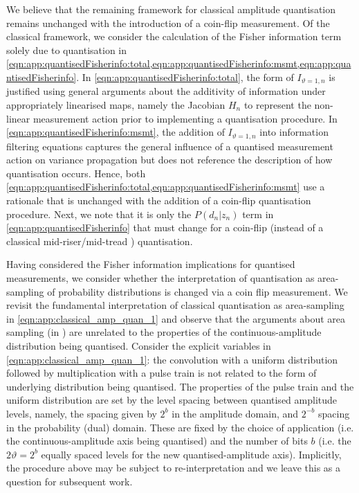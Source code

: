 We believe that the remaining framework for classical amplitude quantisation remains unchanged with the introduction of a coin-flip measurement. Of the classical framework, we consider the calculation of the Fisher information term solely due to quantisation in  \cref{eqn:app:quantisedFisherinfo:total,eqn:app:quantisedFisherinfo:msmt,eqn:app:quantisedFisherinfo}.  In \cref{eqn:app:quantisedFisherinfo:total}, the form of  $I_{\vartheta=1, n}$ is justified using general arguments about the additivity of information under appropriately linearised maps, namely the Jacobian $H_n$ to represent the non-linear measurement action prior to implementing a quantisation procedure. In \cref{eqn:app:quantisedFisherinfo:msmt}, the addition of $I_{\vartheta=1, n}$ into information filtering equations captures the general influence of a quantised measurement action on variance propagation but does not reference the description of how quantisation occurs. Hence, both \cref{eqn:app:quantisedFisherinfo:total,eqn:app:quantisedFisherinfo:msmt} use a rationale that is  unchanged with the addition of a coin-flip quantisation procedure. Next, we note that it is only the $P(d_n|z_n)$ term in \cref{eqn:app:quantisedFisherinfo} that must change for a coin-flip (instead of a classical mid-riser/mid-tread ) quantisation.

Having considered the Fisher information implications for quantised measurements, we consider whether the interpretation of quantisation as area-sampling of probability distributions is changed via a coin flip measurement. We revisit the fundamental interpretation of classical quantisation as area-sampling in \cref{eqn:app:classical_amp_quan_1} and observe that the arguments about area sampling (in \cite{widrow1996,karlsson2005}) are unrelated to the properties of the continuous-amplitude distribution being quantised. Consider the explicit variables in \cref{eqn:app:classical_amp_quan_1}: the convolution with a uniform distribution followed by multiplication with a pulse train is not related to the form of underlying distribution being quantised. The properties of the pulse train and the uniform distribution are set by the level spacing between quantised amplitude levels, namely, the spacing given by $2^b$ in the amplitude domain, and $2^{-b}$ spacing in the probability (dual) domain. These are fixed by the choice of application (i.e. the continuous-amplitude axis being quantised) and the number of bits $b$ (i.e. the $2\vartheta=2^b$ equally spaced levels for the new quantised-amplitude axis).  Implicitly, the procedure above may be subject to re-interpretation and we leave this as a question for subsequent work. 

